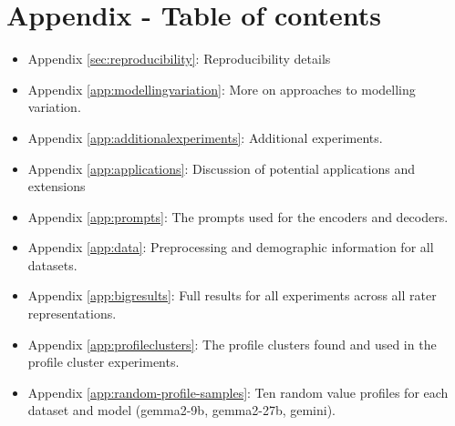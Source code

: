 \documentclass[11pt]{article}
\begin{document}
\section*{Appendix - Table of contents}
\begin{itemize}
\item Appendix \ref{sec:reproducibility}: Reproducibility details
\item Appendix \ref{app:modellingvariation}: More on approaches to modelling variation.
\item Appendix \ref{app:additionalexperiments}: Additional experiments.
\item Appendix \ref{app:applications}: Discussion of potential applications and extensions
\item Appendix \ref{app:prompts}: The prompts used for the encoders and decoders.
\item Appendix \ref{app:data}: Preprocessing and demographic information for all datasets.
\item Appendix \ref{app:bigresults}: Full results for all experiments across all rater representations.
\item Appendix \ref{app:profileclusters}: The profile clusters found and used in the profile cluster experiments.
\item Appendix \ref{app:random-profile-samples}: Ten random value profiles for each dataset and model (gemma2-9b, gemma2-27b, gemini).

\end{itemize}

% 
% 
\end{document}
